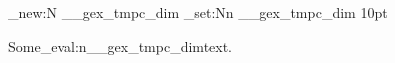 \documentclass{article}
\begin{document}
\ExplSyntaxOn

\dim_new:N \g__gex_tmpc_dim
\dim_set:Nn \g__gex_tmpc_dim {10pt}

Some\kern\dim_eval:n{\g__gex_tmpc_dim}text.

\ExplSyntaxOff
\end{document}
